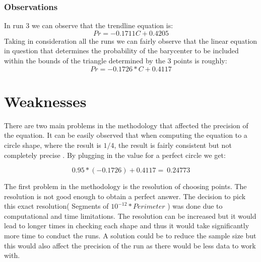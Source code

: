 \documentclass[9pt,onecolumn,oneside]{osajnl}
\begin{document}
\begin{center}
\end{center}

\subsubsection{Observations}

	In run 3 we can observe that the trendline equation is:
\[Pr = -0.1711C + 0.4205\]
	Taking in consideration all the runs we can fairly observe that the linear equation in question that determines the probability of the barycenter to be included within the bounds of the triangle determined by the 3 points is roughly:
\[Pr = -0.1726 * C + 0.4117\]
\section{Weaknesses}

	There are two main problems in the methodology that affected the precision of the equation. It can be easily observed that when computing the equation to a circle shape, where the result is \(1/4\), the result is fairly consistent but not completely precise . By plugging in the value for a perfect circle we get:

\[0.95 * ( -0.1726) + 0.4117 =~ 0.24773\]

	The first problem in the methodology is the resolution of choosing points. The resolution is not good enough to obtain a perfect answer. The decision to pick this exact resolution( Segments of \(10^{-12} * Perimeter\) ) was done due to computational and time limitations. The resolution can be increased but it would lead to longer times in checking each shape and thus it would take significantly more time to conduct the runs. A solution could be to reduce the sample size but this would also affect the precision of the run as there would be less data to work with. 
    
\end{document}
